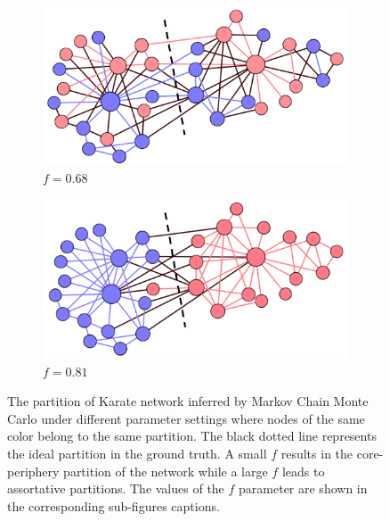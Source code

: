\begin{figure}[!htb]
\begin{subfigure}{.3\textwidth} 
\centering
\includegraphics[width=.99\linewidth]{img/chap2/s068.PNG}
\caption{$f=0.68$}
\end{subfigure}
\begin{subfigure}{.3\textwidth} 
\centering
\includegraphics[width=.99\linewidth]{img/chap2/s081.PNG}
\caption{$f=0.81$}
\end{subfigure}

\caption{The partition of Karate network inferred by Markov Chain Monte Carlo under different parameter settings where nodes of the same color belong to the same partition. The black dotted line represents the ideal partition in the ground truth. A small $f$ results in the core-periphery partition of the network while a large $f$ leads to assortative partitions. The values of the $f$ parameter are shown in the corresponding sub-figures captions.}
\label{fig:karate_figure}
\end{figure}

